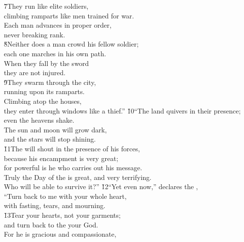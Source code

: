 \begin{poetry}
\poeml \v{7}They run like elite soldiers, \\
\poemll    climbing ramparts like men trained for war. \\
\poeml Each man advances in proper order, \\
\poemll    never breaking rank. \\
\poeml \v{8}Neither does a man crowd his fellow soldier; \\
\poemll    each one marches in his own path. \\
\poeml When they fall by the sword \\
\poemll    they are not injured. \\
\poeml \v{9}They swarm through the city, \\
\poemll    running upon its ramparts. \\
\poeml Climbing atop the houses, \\
\poemll    they enter through windows like a thief.''
\poeml \v{10}``The land quivers in their presence; \\
\poemll    even the heavens shake. \\
\poeml The sun and moon will grow dark, \\
\poemll    and the stars will stop shining. \\
\poeml \v{11}The  will shout in the presence of his forces, \\
\poemll    because his encampment is very great; \\
\poeml for powerful is he who carries out his message. \\
\poemll    Truly the Day of the  is great, and very terrifying. \\
\poemlll       Who will be able to survive it?''
\poeml \v{12}``Yet even now,'' declares the , \\
\poemll    ``Turn back to me with your whole heart, \\
\poemlll       with fasting, tears, and mourning. \\
\poeml \v{13}Tear your hearts, not your garments; \\
\poemll    and turn back to the  your God. \\
\poeml For he is gracious and compassionate, \\

\end{poetry}

